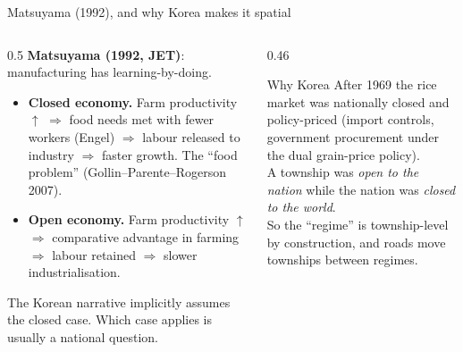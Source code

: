 \documentclass[10pt,aspectratio=169]{beamer}
\newcommand{\hl}[1]{\textcolor{mOrange}{#1}}
\begin{document}
\begin{frame}{Matsuyama (1992), and why Korea makes it spatial}
  \begin{columns}[T]
    \begin{column}{0.5\textwidth}
      \textbf{Matsuyama (1992, JET)}: manufacturing has learning-by-doing.
      \begin{itemize}\small
        \item \textbf{Closed economy.} Farm productivity $\uparrow$ $\Rightarrow$ food
              needs met with fewer workers (Engel) $\Rightarrow$ labour \hl{released} to
              industry $\Rightarrow$ faster growth. The ``food problem''
              (Gollin--Parente--Rogerson 2007).
        \item \textbf{Open economy.} Farm productivity $\uparrow$ $\Rightarrow$
              comparative advantage in farming $\Rightarrow$ labour \hl{retained}
              $\Rightarrow$ slower industrialisation.
      \end{itemize}
      The Korean narrative implicitly assumes the closed case. Which case applies is
      usually a national question.
    \end{column}
    \begin{column}{0.46\textwidth}
      \begin{alertblock}{Why Korea}
        After 1969 the rice market was \hl{nationally closed and policy-priced} (import
        controls, government procurement under the dual grain-price policy).\\[0.4em]
        A township was \emph{open to the nation} while the nation was \emph{closed to the
        world}.\\[0.4em]
        So the ``regime'' is township-level by construction, and roads move townships
        between regimes.
      \end{alertblock}
    \end{column}
  \end{columns}
\end{frame}
\end{document}
